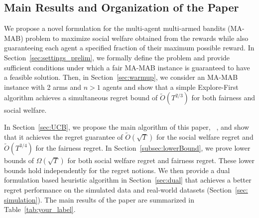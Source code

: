 




\subsection{Main Results and Organization of the Paper} We propose a novel formulation for the multi-agent multi-armed bandits (MA-MAB) problem to maximize social welfare obtained from the rewards while also guaranteeing each agent a specified fraction of their maximum possible reward. In Section~\ref{sec:settings_prelim}, we formally define the problem and provide sufficient conditions under which a fair MA-MAB instance is guaranteed to have a feasible solution. Then, in Section~\ref{sec:warmup}, we consider an MA-MAB instance with 2 arms and $n > 1$ agents and show that a simple {\sc Explore-First} algorithm achieves a simultaneous regret bound of $\tilde{O}(T^{2/3})$ for both fairness and social welfare. 

In Section~\ref{sec:UCB}, we propose the main algorithm of this paper, \ouralgo\ ,  and show that it achieves the regret guarantee of $\tilde{O}(\sqrt{T})$ for the social welfare regret and $\tilde{O}(T^{3/4})$ for the fairness regret. In Section~\ref{subsec:lowerBound}, we prove lower bounds of $\Omega (\sqrt{T})$ for both social welfare regret and fairness regret. These lower bounds hold independently for the regret notions. We then provide a dual formulation based heuristic algorithm in Section~\ref{sec:dual} that achieves a better regret performance on the simulated data and real-world datasets (Section~\ref{sec: simulation}).   The main results of the paper are summarized in  Table~\ref{tab:your_label}. 

